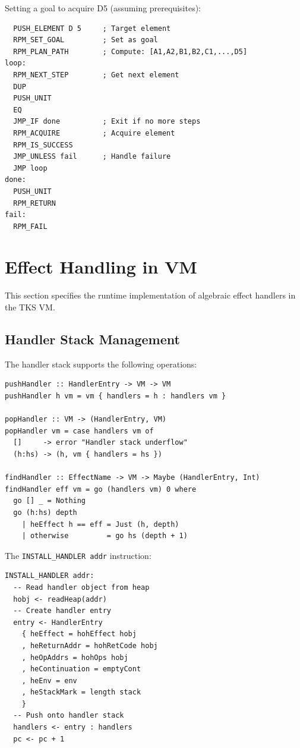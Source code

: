 \begin{example}
\label{ex:rpm-goal}
Setting a goal to acquire D5 (assuming prerequisites):
\begin{verbatim}
  PUSH_ELEMENT D 5     ; Target element
  RPM_SET_GOAL         ; Set as goal
  RPM_PLAN_PATH        ; Compute: [A1,A2,B1,B2,C1,...,D5]
loop:
  RPM_NEXT_STEP        ; Get next element
  DUP
  PUSH_UNIT
  EQ
  JMP_IF done          ; Exit if no more steps
  RPM_ACQUIRE          ; Acquire element
  RPM_IS_SUCCESS
  JMP_UNLESS fail      ; Handle failure
  JMP loop
done:
  PUSH_UNIT
  RPM_RETURN
fail:
  RPM_FAIL
\end{verbatim}
\end{example}

\section{Effect Handling in VM}
\label{sec:effect-handling-vm}

This section specifies the runtime implementation of algebraic effect handlers in the TKS VM.

\subsection{Handler Stack Management}
\label{subsec:handler-stack}

\begin{definition}
\label{def:handler-stack-ops}
The handler stack supports the following operations:
\begin{verbatim}
pushHandler :: HandlerEntry -> VM -> VM
pushHandler h vm = vm { handlers = h : handlers vm }

popHandler :: VM -> (HandlerEntry, VM)
popHandler vm = case handlers vm of
  []     -> error "Handler stack underflow"
  (h:hs) -> (h, vm { handlers = hs })

findHandler :: EffectName -> VM -> Maybe (HandlerEntry, Int)
findHandler eff vm = go (handlers vm) 0 where
  go [] _ = Nothing
  go (h:hs) depth
    | heEffect h == eff = Just (h, depth)
    | otherwise         = go hs (depth + 1)
\end{verbatim}
\end{definition}

\begin{definition}
\label{def:install-handler-semantics}
The \texttt{INSTALL\_HANDLER addr} instruction:
\begin{verbatim}
INSTALL_HANDLER addr:
  -- Read handler object from heap
  hobj <- readHeap(addr)
  -- Create handler entry
  entry <- HandlerEntry
    { heEffect = hohEffect hobj
    , heReturnAddr = hohRetCode hobj
    , heOpAddrs = hohOps hobj
    , heContinuation = emptyCont
    , heEnv = env
    , heStackMark = length stack
    }
  -- Push onto handler stack
  handlers <- entry : handlers
  pc <- pc + 1
\end{verbatim}
\end{definition}

